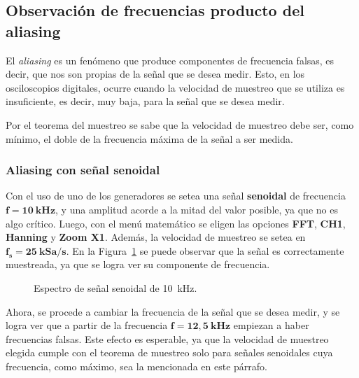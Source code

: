   \pagebreak
  \subsection{Observación de frecuencias producto del aliasing}
    El \textit{aliasing} es un fenómeno que produce componentes de frecuencia falsas, es decir,
    que nos son propias de la señal que se desea medir. Esto, en los osciloscopios digitales,
    ocurre cuando la velocidad de muestreo que se utiliza es insuficiente, es decir, muy baja,
    para la señal que se desea medir.
    
    Por el teorema del muestreo se sabe que la velocidad de muestreo debe ser, como mínimo, el
    doble de la frecuencia máxima de la señal a ser medida.

    \subsubsection{Aliasing con señal senoidal}
      Con el uso de uno de los generadores se setea una señal \textbf{senoidal} de frecuencia
      $\mathbf{f = 10~kHz}$, y una amplitud acorde a la mitad del valor posible, ya que no es
      algo crítico. Luego, con el menú matemático se eligen las opciones \textbf{FFT}, \textbf{CH1},
      \textbf{Hanning} y \textbf{Zoom X1}. Además, la velocidad de muestreo se setea en 
      $\mathbf{f_s = 25~kSa/s}$. En la Figura~\ref{fig:Exp3Señal10k} se puede observar que la señal 
      es correctamente muestreada, ya que se logra ver su componente de frecuencia.
      
      \begin{figure}[H]
        \centering
        \caption{Espectro de señal senoidal de 10~kHz.}
        \label{fig:Exp3Señal10k}
      \end{figure}
      
      Ahora, se procede a cambiar la frecuencia de la señal que se desea medir, y se logra ver que
      a partir de la frecuencia $\mathbf{f = 12,5~kHz}$ empiezan a haber frecuencias falsas. Este
      efecto es esperable, ya que la velocidad de muestreo elegida cumple con el teorema de muestreo
      solo para señales senoidales cuya frecuencia, como máximo, sea la mencionada en este párrafo.

